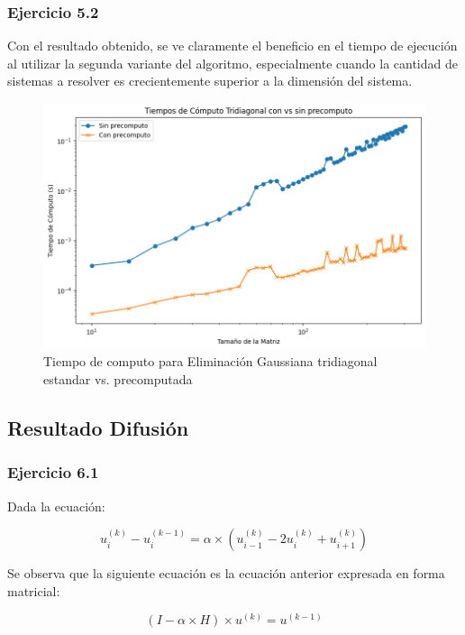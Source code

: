 \subsubsection{Ejercicio 5.2}

Con el resultado obtenido, se ve claramente el beneficio en el tiempo de ejecución al utilizar la segunda variante del algoritmo, especialmente cuando la cantidad de sistemas a resolver es crecientemente superior a la dimensión del sistema.

\begin{figure}[H]
\centerline{\includegraphics[scale=0.45]{./img/tiempos_tridiagConVsSinP.png}}
\caption{Tiempo de computo para Eliminación Gaussiana tridiagonal estandar vs. precomputada}
\label{result_ej5_2do}
\end{figure}


\subsection{Resultado Difusión}
\label{difusion}
\subsubsection{Ejercicio 6.1}
Dada la ecuación:

\begin{equation}
u_{i}^{(k)} - u_{i}^{(k-1)} = \alpha \times (u_{i-1}^{(k)} - 2u_{i}^{(k)} + u_{i+1}^{(k)})
\end{equation}

Se observa que la siguiente ecuación es la ecuación anterior expresada en forma matricial:

\begin{equation}
(I - \alpha \times H) \times u^{(k)} = u^{(k-1)}
\end{equation}

